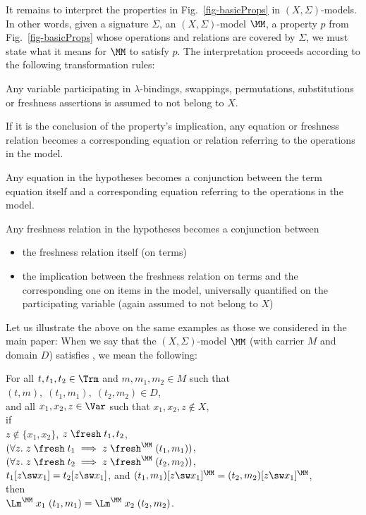 It remains to interpret the properties in Fig.~\ref{fig-basicProps} in  $(X,\Sigma)$-models. In other words, given a signature $\Sigma$, an $(X,\Sigma)$-model $\MM$, a property $p$ from  Fig.~\ref{fig-basicProps} whose operations and relations are covered by $\Sigma$, we must state what it means for $\MM$ to satisfy $p$. The interpretation proceeds according to the following transformation rules:
\begin{myitem}
	\item[(1)] Any variable participating in $\lambda$-bindings, swappings, permutations, substitutions or freshness assertions is assumed to not belong to $X$.
	\item[(2)]  If it is the conclusion of the property's implication, any equation %
	or freshness relation 
	becomes a corresponding equation or relation referring to the operations in the model. 
	\item[(3)] Any equation in the hypotheses 
	becomes a conjunction between the term equation itself and a corresponding equation referring to the operations in the model. 
	\item[(4)] Any freshness relation in the hypotheses becomes a conjunction between 
	  \begin{itemize}
	  	\item the freshness relation itself (on terms)
	  	\item the implication between the freshness relation on terms and the corresponding one on items in the model, universally quantified on the participating variable (again assumed to not belong to $X$) 
	  \end{itemize} 
\end{myitem}
%

Let us illustrate the above on the same examples as those we considered in the main paper:
When we say that the $(X,\Sigma)$-model $\MM$ (with carrier $M$ and domain $D$) satisfies \SwCg{}, we mean the following:  
\begin{center} 
For all $t,t_1,t_2\in  \Trm$ and 
$m,m_1,m_2\in  M$ such that $(t,m),\;(t_1,m_1),\;(t_2,m_2) \in D$, 
\\and all
$x_1,x_2,z\in \Var$ such that $x_1,x_2,z \notin  X$, 
\\
if 
\\$z \not\in \{x_1,x_2\}$, 
$z\;\fresh\;t_1,t_2$, 
\\ 
$(\forall z.\;  z\;\fresh\;t_1 \implies z\;\fresh^\MM\;(t_1,m_1))$, 
\\
$(\forall z.\;  z\;\fresh\;t_2 \implies z\;\fresh^\MM\;(t_2,m_2))$, 
\\
$t_1[z\sw x_1] = t_2[z\sw x_1]$, and 
$(t_1,m_1)[z\sw x_1]^\MM = (t_2,m_2)[z\sw x_1]^\MM$,  
\\
then 
\\
$\Lm^\MM\;x_1\;(t_1,m_1) = \Lm^\MM\;x_2\;(t_2,m_2)$.  
\end{center} 
%

